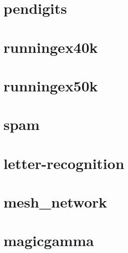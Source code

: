 \section{pendigits}
\label{sec:dataSets:pendigits}

\section{runningex40k}
\label{sec:dataSets:runningex40k}

\section{runningex50k}
\label{sec:dataSets:runningex50k}

\section{spam}
\label{sec:dataSets:spam}

\section{letter-recognition}
\label{sec:dataSets:letter-recognition}

\section{mesh\_network}
\label{sec:dataSets:mesh_network}

\section{magicgamma}
\label{sec:dataSets:magicgamma}

